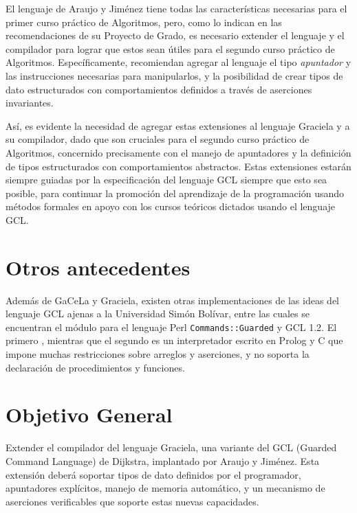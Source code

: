 El lenguaje de Araujo y Jiménez tiene todas las características necesarias para
el primer curso práctico de Algoritmos, pero, como lo indican en las
recomendaciones de su Proyecto de Grado, es necesario extender el lenguaje y el
compilador para lograr que estos sean útiles para el segundo curso práctico de
Algoritmos. Específicamente, recomiendan agregar al lenguaje el tipo
\textit{apuntador} y las instrucciones necesarias para manipularlos, y la
posibilidad de crear tipos de dato estructurados con comportamientos definidos
a través de aserciones invariantes.

Así, es evidente la necesidad de agregar estas extensiones al lenguaje Graciela
y a su compilador, dado que son cruciales para el segundo curso práctico de
Algoritmos, concernido precisamente con el manejo de apuntadores y la definición
de tipos estructurados con comportamientos abstractos. Estas extensiones estarán
siempre guiadas por la especificación del lenguaje GCL siempre que esto sea
posible, para continuar la promoción del aprendizaje de la programación usando
métodos formales en apoyo con los cursos teóricos dictados usando el lenguaje
GCL.

\section*{Otros antecedentes}

Además de GaCeLa y Graciela, existen otras implementaciones de las ideas del
lenguaje GCL ajenas a la Universidad Simón Bolívar, entre las cuales se
encuentran el módulo para el lenguaje Perl \texttt{Commands::Guarded} y GCL 1.2.
El primero , mientras que el segundo es
un interpretador escrito en Prolog y C que impone muchas restricciones sobre
arreglos y aserciones, y no soporta la declaración de procedimientos y
funciones.

\section*{Objetivo General}

Extender el compilador del lenguaje Graciela, una variante del GCL (Guarded
Command Language) de Dijkstra, implantado por Araujo y Jiménez. Esta extensión
deberá soportar tipos de dato definidos por el programador, apuntadores
explícitos, manejo de memoria automático, y un mecanismo de aserciones
verificables que soporte estas nuevas capacidades.


